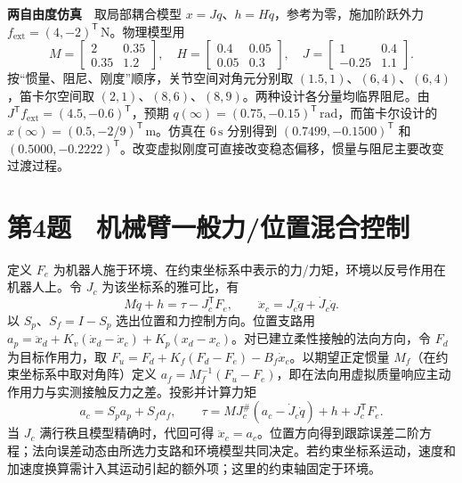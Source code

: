 \textbf{两自由度仿真}　取局部耦合模型 $x=Jq$、$h=H\dot q$，参考为零，施加阶跃外力 $f_{\mathrm{ext}}=(4,-2)^{\mathsf T}\,\mathrm N$。物理模型用
\[
 M=\begin{bmatrix}2&0.35\\0.35&1.2\end{bmatrix},\quad
 H=\begin{bmatrix}0.4&0.05\\0.05&0.3\end{bmatrix},\quad
 J=\begin{bmatrix}1&0.4\\-0.25&1.1\end{bmatrix}.
\]
按“惯量、阻尼、刚度”顺序，关节空间对角元分别取 $(1.5,1)$、$(6,4)$、$(6,4)$，笛卡尔空间取 $(2,1)$、$(8,6)$、$(8,9)$。两种设计各分量均临界阻尼。由 $J^{\mathsf T}f_{\mathrm{ext}}=(4.5,-0.6)^{\mathsf T}$，预期 $q(\infty)=(0.75,-0.15)^{\mathsf T}\,\mathrm{rad}$，而笛卡尔设计的 $x(\infty)=(0.5,-2/9)^{\mathsf T}\,\mathrm m$。仿真在 $6\,\mathrm s$ 分别得到 $(0.7499,-0.1500)^{\mathsf T}$ 和 $(0.5000,-0.2222)^{\mathsf T}$。改变虚拟刚度可直接改变稳态偏移，惯量与阻尼主要改变过渡过程。


\section*{第4题　机械臂一般力/位置混合控制}
\label{hw:control-4}
定义 $F_e$ 为机器人施于环境、在约束坐标系中表示的力/力矩，环境以反号作用在机器人上。令 $J_c$ 为该坐标系的雅可比，有
\[
 M\ddot q+h=\tau-J_c^{\mathsf T}F_e,\qquad
 \ddot x_c=J_c\ddot q+\dot J_c\dot q.
\]
以 $S_p$、$S_f=I-S_p$ 选出位置和力控制方向。位置支路用 $a_p=\ddot x_d+K_v(\dot x_d-\dot x_c)+K_p(x_d-x_c)$。对已建立柔性接触的法向方向，令 $F_d$ 为目标作用力，取 $F_u=F_d+K_f(F_d-F_e)-B_f\dot x_c$。以期望正定惯量 $M_f$（在约束坐标系中取对角阵）定义 $a_f=M_f^{-1}(F_u-F_e)$，即在法向用虚拟质量响应主动作用力与实测接触反力之差。投影并计算力矩
\[
 a_c=S_p a_p+S_f a_f,\qquad
 \tau=MJ_c^\#(a_c-\dot J_c\dot q)+h+J_c^{\mathsf T}F_e.
\]
当 $J_c$ 满行秩且模型精确时，代回可得 $\ddot x_c=a_c$。位置方向得到跟踪误差二阶方程；法向误差动态由所选力支路和环境模型共同决定。若约束坐标系运动，速度和加速度换算需计入其运动引起的额外项；这里的约束轴固定于环境。

